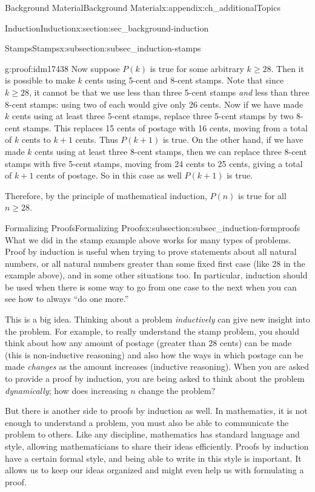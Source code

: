 \documentclass[oneside,10pt,]{book}
\numberwithin{equation}{chapter}
\begin{document}
\begin{appendixptx}{Background Material}{}{Background Material}{}{}{x:appendix:ch_additionalTopics}
\begin{sectionptx}{Induction}{}{Induction}{}{}{x:section:sec_background-induction}
\begin{subsectionptx}{Stamps}{}{Stamps}{}{}{x:subsection:subsec_induction-stamps}
\begin{proofptx}{}{g:proof:idm17438}
Now suppose \(P(k)\) is true for some arbitrary \(k \ge 28\). Then it is possible to make \(k\) cents using 5-cent and 8-cent stamps. Note that since \(k \ge 28\), it cannot be that we use less than three 5-cent stamps \emph{and} less than three 8-cent stamps: using two of each would give only 26 cents. Now if we have made \(k\) cents using at least three 5-cent stamps, replace three 5-cent stamps by two 8-cent stamps. This replaces 15 cents of postage with 16 cents, moving from a total of \(k\) cents to \(k+1\) cents. Thus \(P(k+1)\) is true. On the other hand, if we have made \(k\) cents using at least three 8-cent stamps, then we can replace three 8-cent stamps with five 5-cent stamps, moving from 24 cents to 25 cents, giving a total of \(k+1\) cents of postage. So in this case as well \(P(k+1)\) is true.%
\par
Therefore, by the principle of mathematical induction, \(P(n)\) is true for all \(n \ge 28\).%
\end{proofptx}
\end{subsectionptx}
%
%
\typeout{************************************************}
\typeout{************************************************}
%
\begin{subsectionptx}{Formalizing Proofs}{}{Formalizing Proofs}{}{}{x:subsection:subsec_induction-formproofs}
What we did in the stamp example above works for many types of problems. Proof by induction is useful when trying to prove statements about all natural numbers, or all natural numbers greater than some fixed first case (like 28 in the example above), and in some other situations too. In particular, induction should be used when there is some way to go from one case to the next \textendash{} when you can see how to always ``do one more.''%
\par
This is a big idea. Thinking about a problem \emph{inductively} can give new insight into the problem. For example, to really understand the stamp problem, you should think about how any amount of postage (greater than 28 cents) can be made (this is non-inductive reasoning) and also how the ways in which postage can be made \emph{changes} as the amount increases (inductive reasoning). When you are asked to provide a proof by induction, you are being asked to think about the problem \emph{dynamically}; how does increasing \(n\) change the problem?%
\par
But there is another side to proofs by induction as well. In mathematics, it is not enough to understand a problem, you must also be able to communicate the problem to others. Like any discipline, mathematics has standard language and style, allowing mathematicians to share their ideas efficiently. Proofs by induction have a certain formal style, and being able to write in this style is important. It allows us to keep our ideas organized and might even help us with formulating a proof.%

\end{subsectionptx}
\end{sectionptx}
\end{appendixptx}
\end{document}
